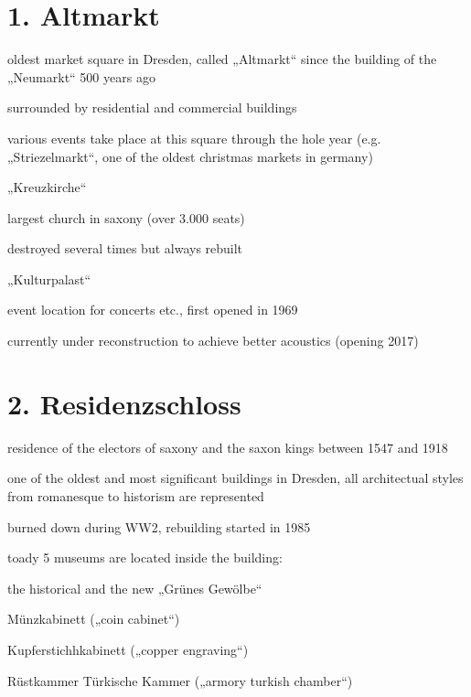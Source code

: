 \documentclass[a4paper,12pt]{report}
\begin{document}
\section{1. Altmarkt}
\begin{itemize*}
\item oldest market square in Dresden, called „Altmarkt“ since the building of the „Neumarkt“ 500 years ago
\item surrounded by residential and commercial buildings
\item various events take place at this square through the hole year (e.g. „Striezelmarkt“, one of the oldest christmas markets in germany)
\item „Kreuzkirche“
    \begin{itemize*}
    \item largest church in saxony (over 3.000 seats)
    \item destroyed several times but always rebuilt
    \end{itemize*}
\item „Kulturpalast“
    \begin{itemize*}
    \item event location for concerts etc., first opened in 1969
    \item currently under reconstruction to achieve better acoustics (opening 2017)
    \end{itemize*}
\end{itemize*}

\section{2. Residenzschloss}
\begin{itemize*}
\item residence of the electors of saxony and the saxon kings between 1547 and 1918
\item one of the oldest and most significant buildings in Dresden, all architectual styles from romanesque to historism are represented
\item burned down during WW2, rebuilding started in 1985
\item toady 5 museums are located inside the building:
    \begin{itemize*}
    \item the historical and the new „Grünes Gewölbe“
    \item Münzkabinett („coin cabinet“)
    \item Kupferstichhkabinett („copper engraving“)
    \item Rüstkammer Türkische Kammer („armory turkish chamber“)
    \end{itemize*}
\end{itemize*}
\end{document}
